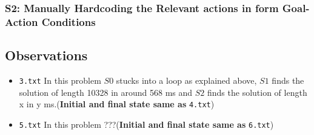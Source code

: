 \documentclass{article}
\begin{document}
\subsubsection{S2: Manually Hardcoding the Relevant actions in form Goal-Action Conditions}
\pagebreak
\subsection{Observations}
\begin{itemize}
\item \verb|3.txt| In this problem $S0$ stucks into a loop as explained above, $S1$ finds the solution of length 10328 in around 568 ms and $S2$ finds the solution of length x in y ms.(\textbf{Initial and final state same as} \verb|4.txt|)

\item \verb|5.txt| In this problem ???(\textbf{Initial and final state same as} \verb|6.txt|)
\end{itemize}
\end{document}

